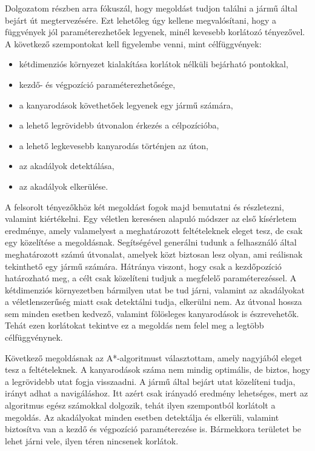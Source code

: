 

Dolgozatom részben arra fókuszál, hogy megoldást tudjon találni a jármű által bejárt út megtervezésére. Ezt lehetőleg úgy kellene megvalósítani, hogy a függvények jól paraméterezhetőek legyenek, minél kevesebb korlátozó tényezővel. A következő szempontokat kell figyelembe venni, mint célfüggvények:
\begin{itemize}
	\item kétdimenziós környezet kialakítása korlátok nélküli bejárható pontokkal,
	\item kezdő- és végpozíció paraméterezhetősége,
	\item a kanyarodások követhetőek legyenek egy jármű számára,
	\item a lehető legrövidebb útvonalon érkezés a célpozícióba,
	\item a lehető legkevesebb kanyarodás történjen az úton,
	\item az akadályok detektálása,
	\item az akadályok elkerülése.
\end{itemize}
A felsorolt tényezőkhöz két megoldást fogok majd bemutatni és részletezni, valamint kiértékelni. Egy véletlen keresésen alapuló módszer az első kísérletem eredménye, amely valamelyest a meghatározott feltételeknek eleget tesz, de csak egy közelítése a megoldásnak. Segítségével generálni tudunk a felhasználó által meghatározott számú útvonalat, amelyek közt biztosan lesz olyan, ami reálisnak tekinthető egy jármű számára. Hátránya viszont, hogy csak a kezdőpozíció határozható meg, a célt csak közelíteni tudjuk a megfelelő paraméterezéssel. A kétdimenziós környezetben bármilyen utat be tud járni, valamint az akadályokat a véletlenszerűség miatt csak detektálni tudja, elkerülni nem. Az útvonal hossza sem minden esetben kedvező, valamint fölösleges kanyarodások is észrevehetők. Tehát ezen korlátokat tekintve ez a megoldás nem felel meg a legtöbb célfüggvénynek.

Következő megoldásnak az A*-algoritmust választottam, amely nagyjából eleget tesz a feltételeknek. A kanyarodások száma nem mindig optimális, de biztos, hogy a legrövidebb utat fogja visszaadni. A jármű által bejárt utat közelíteni tudja, irányt adhat a navigáláshoz. Itt azért csak irányadó eredmény lehetséges, mert az algoritmus egész számokkal dolgozik, tehát ilyen szempontból korlátolt a megoldás. Az akadályokat minden esetben detektálja és elkerüli, valamint biztosítva van a kezdő és végpozíció paraméterezése is. Bármekkora területet be lehet járni vele, ilyen téren nincsenek korlátok.  

